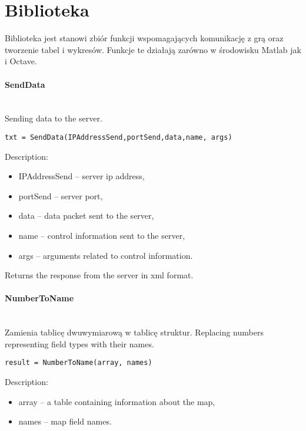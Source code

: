 \section{Biblioteka}

Biblioteka jest stanowi zbiór funkcji wspomagających komunikację z grą oraz tworzenie tabel i wykresów. Funkcje te działają zarówno w środowisku Matlab jak i Octave.

\paragraph{SendData} \hspace{0pt} \\
Sending data to the server.

\begin{lstlisting}[style=Matlab-editor]
txt = SendData(IPAddressSend,portSend,data,name, args)
\end{lstlisting}

Description:
\begin{itemize}
\item  IPAddressSend -- server ip address,
\item  portSend -- server port,
\item  data -- data packet sent to the server,
\item  name  -- control information sent to the server,
\item  args  -- arguments related to control information.
\end{itemize}

Returns the response from the server in xml format.

\paragraph{NumberToName} \hspace{0pt} \\
Zamienia tablicę dwuwymiarową w tablicę struktur. Replacing numbers representing field types with their names.
\begin{lstlisting}[style=Matlab-editor]
result = NumberToName(array, names)
\end{lstlisting}

Description:
\begin{itemize}
\item  array -- a table containing information about the map,
\item  names -- map field names.
\end{itemize}

